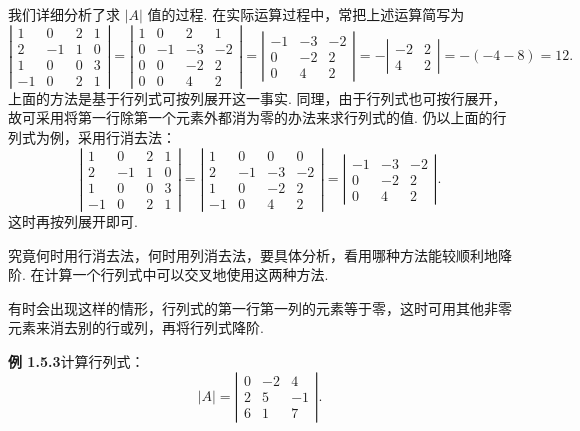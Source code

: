 \documentclass[UTF8,12pt,a4paper,fontset=fandol]{ctexart}
\begin{document}
我们详细分析了求 $|A|$ 值的过程. 在实际运算过程中，常把上述运算简写为
\[
\left|\begin{array}{rrrr}
1 & 0 & 2 & 1\\
2 & -1 & 1 & 0\\
1 & 0 & 0 & 3\\
-1 & 0 & 2 & 1
\end{array}\right|
=
\left|\begin{array}{rrrr}
1 & 0 & 2 & 1\\
0 & -1 & -3 & -2\\
0 & 0 & -2 & 2\\
0 & 0 & 4 & 2
\end{array}\right|
=
\left|\begin{array}{rrr}
-1 & -3 & -2\\
0 & -2 & 2\\
0 & 4 & 2
\end{array}\right|
=-
\left|\begin{array}{rr}
-2 & 2\\
4 & 2
\end{array}\right|
=-(-4-8)=12.
\]
上面的方法是基于行列式可按列展开这一事实. 同理，由于行列式也可按行展开，故可采用将第一行除第一个元素外都消为零的办法来求行列式的值. 仍以上面的行列式为例，采用行消去法：
\[
\left|\begin{array}{rrrr}
1 & 0 & 2 & 1\\
2 & -1 & 1 & 0\\
1 & 0 & 0 & 3\\
-1 & 0 & 2 & 1
\end{array}\right|
=
\left|\begin{array}{rrrr}
1 & 0 & 0 & 0\\
2 & -1 & -3 & -2\\
1 & 0 & -2 & 2\\
-1 & 0 & 4 & 2
\end{array}\right|
=
\left|\begin{array}{rrr}
-1 & -3 & -2\\
0 & -2 & 2\\
0 & 4 & 2
\end{array}\right|.
\]
这时再按列展开即可.

究竟何时用行消去法，何时用列消去法，要具体分析，看用哪种方法能较顺利地降阶. 在计算一个行列式中可以交叉地使用这两种方法.

有时会出现这样的情形，行列式的第一行第一列的元素等于零，这时可用其他非零元素来消去别的行或列，再将行列式降阶.

\noindent\textbf{例 1.5.3}\quad 计算行列式：
\[
|A|=\left|\begin{array}{rrr}
0 & -2 & 4\\
2 & 5 & -1\\
6 & 1 & 7
\end{array}\right|.
\]
\end{document}
